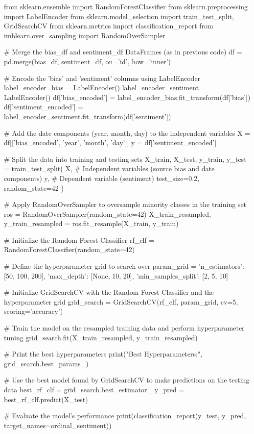 \begin{pyin}
from sklearn.ensemble import RandomForestClassifier
from sklearn.preprocessing import LabelEncoder
from sklearn.model_selection import train_test_split, GridSearchCV
from sklearn.metrics import classification_report
from imblearn.over_sampling import RandomOverSampler

# Merge the bias_df and sentiment_df DataFrames (as in previous code)
df = pd.merge(bias_df, sentiment_df, on='id', how='inner')

# Encode the 'bias' and 'sentiment' columns using LabelEncoder
label_encoder_bias = LabelEncoder()
label_encoder_sentiment = LabelEncoder()
df['bias_encoded'] = label_encoder_bias.fit_transform(df['bias'])
df['sentiment_encoded'] = label_encoder_sentiment.fit_transform(df['sentiment'])

# Add the date components (year, month, day) to the independent variables
X = df[['bias_encoded', 'year', 'month', 'day']]
y = df['sentiment_encoded']

# Split the data into training and testing sets
X_train, X_test, y_train, y_test = train_test_split(
    X,  # Independent variables (source bias and date components)
    y,  # Dependent variable (sentiment)
    test_size=0.2,
    random_state=42
)

# Apply RandomOverSampler to oversample minority classes in the training set
ros = RandomOverSampler(random_state=42)
X_train_resampled, y_train_resampled = ros.fit_resample(X_train, y_train)

# Initialize the Random Forest Classifier
rf_clf = RandomForestClassifier(random_state=42)

# Define the hyperparameter grid to search over
param_grid = {
    'n_estimators': [50, 100, 200],
    'max_depth': [None, 10, 20],
    'min_samples_split': [2, 5, 10]
}

# Initialize GridSearchCV with the Random Forest Classifier and the hyperparameter grid
grid_search = GridSearchCV(rf_clf, param_grid, cv=5, scoring='accuracy')

# Train the model on the resampled training data and perform hyperparameter tuning
grid_search.fit(X_train_resampled, y_train_resampled)

# Print the best hyperparameters
print("Best Hyperparameters:", grid_search.best_params_)

# Use the best model found by GridSearchCV to make predictions on the testing data
best_rf_clf = grid_search.best_estimator_
y_pred = best_rf_clf.predict(X_test)

# Evaluate the model's performance
print(classification_report(y_test, y_pred, target_names=ordinal_sentiment))
\end{pyin}

